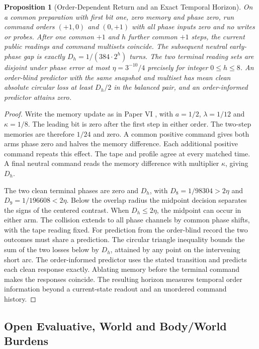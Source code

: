 \documentclass[11pt,a4paper]{article}
\newtheorem{proposition}[theorem]{Proposition}
\theoremstyle{definition}
\begin{document}
\begin{proposition}[Order-Dependent Return and an Exact Temporal Horizon]\label{prop:bridge-tower-temporal-order}
On a common preparation with first bit one, zero memory and phase zero, run command orders $(+1,0)$ and $(0,+1)$ with all phase inputs zero and no writes or probes. After one common $+1$ and $h$ further common $+1$ steps, the current public readings and command multisets coincide. The subsequent neutral early-phase gap is exactly $D_h=1/(384\cdot 2^h)$ turns. The two terminal reading sets are disjoint under phase error at most $\eta=3^{-10}/4$ precisely for integer $0\le h\le8$. An order-blind predictor with the same snapshot and multiset has mean clean absolute circular loss at least $D_h/2$ in the balanced pair, and an order-informed predictor attains zero.
\end{proposition}
\begin{proof}
Write the memory update as in Paper VI \cite{paper6}, with $a=1/2$, $\lambda=1/12$ and $\kappa=1/8$. The leading bit is zero after the first step in either order. The two-step memories are therefore $1/24$ and zero. A common positive command gives both arms phase zero and halves the memory difference. Each additional positive command repeats this effect. The tape and profile agree at every matched time. A final neutral command reads the memory difference with multiplier $\kappa$, giving $D_h$.

The two clean terminal phases are zero and $D_h$, with $D_8=1/98304>2\eta$ and $D_9=1/196608<2\eta$. Below the overlap radius the midpoint decision separates the signs of the centered contrast. When $D_h\le2\eta$, the midpoint can occur in either arm. The collision extends to all phase channels by common phase shifts, with the tape reading fixed. For prediction from the order-blind record the two outcomes must share a prediction. The circular triangle inequality bounds the sum of the two losses below by $D_h$, attained by any point on the intervening short arc. The order-informed predictor uses the stated transition and predicts each clean response exactly. Ablating memory before the terminal command makes the responses coincide. The resulting horizon measures temporal order information beyond a current-state readout and an unordered command history.
\end{proof}

\subsection{Open Evaluative, World and Body/World Burdens}
\end{document}
